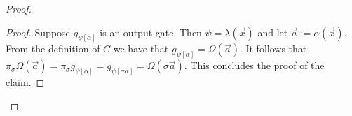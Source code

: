 \documentclass[../main/thesis.tex]{subfiles}
\begin{document}
\begin{proof}
\begin{proof}

  Suppose $g_{\psi[\alpha]}$ is an output gate. Then $\psi = \lambda (\vec{x})$
  and let $\vec{a} := \alpha(\vec{x})$. From the definition of $C$ we have that
  $g_{\psi[\alpha]} = \Omega(\vec{a})$. It follows that $\pi_{\sigma} \Omega
  (\vec{a}) = \pi_\sigma g_{\psi[\alpha]} = g_{\psi[\sigma \alpha]} =
  \Omega(\sigma \vec{a})$. This concludes the proof of the claim.

\end{proof}


\end{proof}
\end{document}
